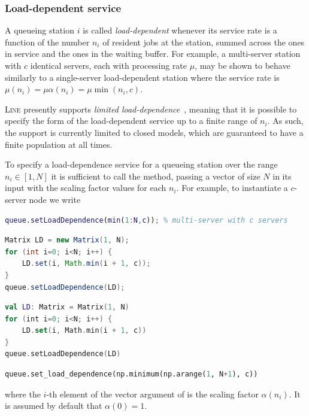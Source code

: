 \subsubsection{Load-dependent service}
A queueing station $i$ is called \textit{load-dependent} whenever its service rate is a function of the number $n_i$ of resident jobs at the station, summed across the ones in service and the ones in the waiting buffer. For example, a multi-server station with $c$ identical servers, each with processing rate $\mu$, may be shown to behave similarly to a single-server load-dependent station where the service rate is $\mu(n_i)=\mu\alpha(n_i)=\mu\min(n_i,c)$.

\textsc{Line} presently supports \textit{limited load-dependence}~\cite{CasHH21}, meaning that it is possible to specify the form of the load-dependent service up to a finite range of $n_i$. As such, the support is currently limited to closed models, which are guaranteed to have a finite population at all times.

To specify a load-dependence service for a queueing station over the range $n_i \in[1,N]$ it is sufficient to call the  method, passing a vector of size $N$ in its input with the scaling factor values for each $n_i$. For example, to instantiate a $c$-server node we write
\begin{MATLAB}
\begin{lstlisting}[language = matlab]
queue.setLoadDependence(min(1:N,c)); % multi-server with c servers 
\end{lstlisting}
\end{MATLAB}
\begin{JAVA}
\begin{lstlisting}[language = java, basicstyle=\ttfamily\scriptsize]
Matrix LD = new Matrix(1, N);
for (int i=0; i<N; i++) {
    LD.set(i, Math.min(i + 1, c));
}
queue.setLoadDependence(LD);
\end{lstlisting}
\end{JAVA}
\begin{KOTLIN}
\begin{lstlisting}[language = kotlin, basicstyle=\ttfamily\scriptsize]
val LD: Matrix = Matrix(1, N)
for (int i=0; i<N; i++) {
    LD.set(i, Math.min(i + 1, c))
}
queue.setLoadDependence(LD)
\end{lstlisting}
\end{KOTLIN}
\begin{PYTHON}
\begin{lstlisting}[language = python]
queue.set_load_dependence(np.minimum(np.arange(1, N+1), c))
\end{lstlisting}
\end{PYTHON}
where the $i$-th element of the vector argument of  is the scaling factor $\alpha(n_i)$. It is assumed by default that $\alpha(0)=1$.

